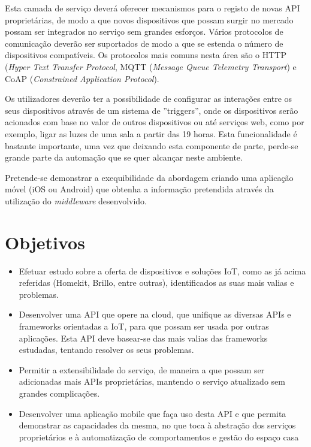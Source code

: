 Esta camada de serviço deverá oferecer mecanismos para o registo de novas API proprietárias, de modo a que novos dispositivos que possam surgir no mercado possam ser integrados no serviço sem grandes esforços. Vários protocolos de comunicação deverão ser suportados de modo a que se estenda o número de dispositivos compatíveis. Os protocolos mais comuns nesta área são o HTTP (\textit{Hyper Text Transfer Protocol}, MQTT (\textit{Message Queue Telemetry Transport}) e CoAP (\textit{Constrained Application Protocol}).

Os utilizadores deverão ter a possibilidade de configurar as interações entre os seus dispositivos através de um sistema de ''triggers'', onde os dispositivos serão acionados com base no valor de outros dispositivos ou até serviços web, como por exemplo, ligar as luzes de uma sala a partir das 19 horas. Esta funcionalidade é bastante importante, uma vez que deixando esta componente de parte, perde-se grande parte da automação que se quer alcançar neste ambiente. 

Pretende-se demonstrar a exequibilidade da abordagem criando uma aplicação móvel (iOS ou Android) que obtenha a informação pretendida através da utilização do \textit{middleware} desenvolvido.

\newpage

\section{Objetivos}

\begin{itemize}
\item Efetuar estudo sobre a oferta de dispositivos e soluções IoT, como as já acima referidas (Homekit, Brillo, entre outras), identificados as suas mais valias e problemas.
\item Desenvolver uma API que opere na cloud, que unifique as diversas APIs e frameworks orientadas a IoT, para que possam ser usada por outras aplicações. Esta API deve basear-se das mais valias das frameworks estudadas, tentando resolver os seus problemas.
\item Permitir a extensibilidade do serviço, de maneira a que possam ser adicionadas mais APIs proprietárias, mantendo o serviço atualizado sem grandes complicações.
\item Desenvolver uma aplicação mobile que faça uso desta API e que permita demonstrar as capacidades da mesma, no que toca à abstração dos serviços proprietários e à automatização de comportamentos e gestão do espaço casa
\end{itemize}

